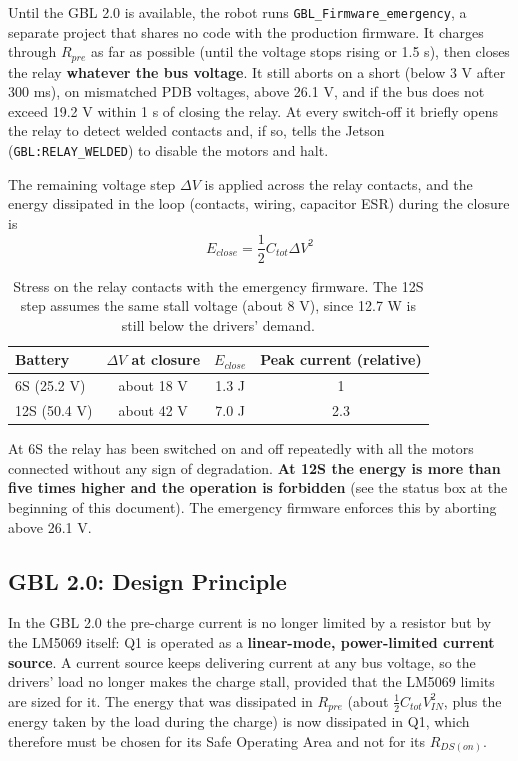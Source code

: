 \documentclass[11pt,a4paper]{article}
\begin{document}
Until the GBL 2.0 is available, the robot runs \texttt{GBL\_Firmware\_emergency}, a separate project that shares no code with the production firmware. It charges through $R_{pre}$ as far as possible (until the voltage stops rising or 1.5 s), then closes the relay \textbf{whatever the bus voltage}. It still aborts on a short (below 3 V after 300 ms), on mismatched PDB voltages, above 26.1 V, and if the bus does not exceed 19.2 V within 1 s of closing the relay. At every switch-off it briefly opens the relay to detect welded contacts and, if so, tells the Jetson (\texttt{GBL:RELAY\_WELDED}) to disable the motors and halt.

The remaining voltage step $\Delta V$ is applied across the relay contacts, and the energy dissipated in the loop (contacts, wiring, capacitor ESR) during the closure is
\begin{equation}
E_{close} = \frac{1}{2} C_{tot} \Delta V^2
\end{equation}

\begin{table}[H]
\centering
\begin{tabular}{lccc}
\toprule
Battery & $\Delta V$ at closure & $E_{close}$ & Peak current (relative) \\
\midrule
6S (25.2 V) & about 18 V & 1.3 J & 1 \\
12S (50.4 V) & about 42 V & 7.0 J & 2.3 \\
\bottomrule
\end{tabular}
\caption{Stress on the relay contacts with the emergency firmware. The 12S step assumes the same stall voltage (about 8 V), since 12.7 W is still below the drivers' demand.}
\end{table}

At 6S the relay has been switched on and off repeatedly with all the motors connected without any sign of degradation. \textbf{At 12S the energy is more than five times higher and the operation is forbidden} (see the status box at the beginning of this document). The emergency firmware enforces this by aborting above 26.1 V.

\subsection{GBL 2.0: Design Principle}

In the GBL 2.0 the pre-charge current is no longer limited by a resistor but by the LM5069 itself: Q1 is operated as a \textbf{linear-mode, power-limited current source}. A current source keeps delivering current at any bus voltage, so the drivers' load no longer makes the charge stall, provided that the LM5069 limits are sized for it. The energy that was dissipated in $R_{pre}$ (about $\frac{1}{2} C_{tot} V_{IN}^2$, plus the energy taken by the load during the charge) is now dissipated in Q1, which therefore must be chosen for its Safe Operating Area and not for its $R_{DS(on)}$.
\end{document}
